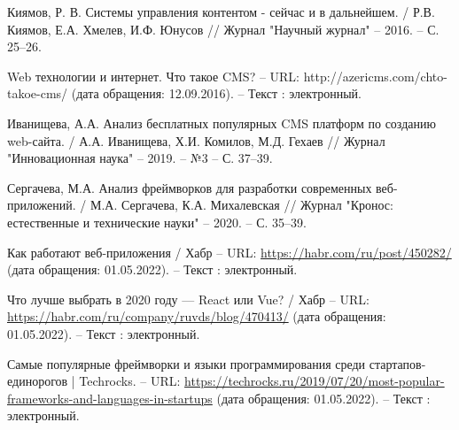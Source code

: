\begin{thebibliography}{00}
        Киямов, Р. В. Системы управления контентом - сейчас и в дальнейшем.
        /
        Р.В. Киямов, Е.А. Хмелев, И.Ф. Юнусов
        //
        Журнал "Научный журнал"
        --
        2016.
        --
        С. 25--26.

        Web технологии и интернет. Что такое CMS?
        --
        URL:
        http://azericms.com/chto-takoe-cms/
        (дата обращения: 12.09.2016).
        --
        Текст : электронный.


        Иванищева, А.А. Анализ бесплатных популярных CMS платформ по созданию web-сайта.
        /
        А.А. Иванищева, Х.И. Комилов, М.Д. Гехаев
        //
        Журнал "Инновационная наука"
        --
        2019.
        --
        №3
        --
        С. 37--39.

        Сергачева, М.А. Анализ фреймворков для разработки современных веб-приложений.
        /
        М.А. Сергачева, К.А. Михалевская
        //
        Журнал "Кронос: естественные и технические науки"
        --
        2020.
        --
        С. 35--39.

        Как работают веб-приложения / Хабр
        --
        URL:
        \href{https://habr.com/ru/post/450282/}{https://habr.com/ru/post/450282/}
        (дата обращения: 01.05.2022).
        --
        Текст : электронный.

        Что лучше выбрать в 2020 году — React или Vue? / Хабр
        --
        URL:
        \href{https://habr.com/ru/company/ruvds/blog/470413/}{https://habr.com/ru/company/ruvds/blog/470413/}
        (дата обращения: 01.05.2022).
        --
        Текст : электронный.

        Самые популярные фреймворки и языки программирования среди стартапов-единорогов | Techrocks.
        --
        URL:
        \href{https://techrocks.ru/2019/07/20/most-popular-frameworks-and-languages-in-startups}{https://techrocks.ru/2019/07/20/most-popular-frameworks-and-languages-in-startups}
        (дата обращения: 01.05.2022).
        --
        Текст : электронный.



\end{thebibliography}

